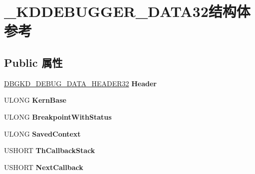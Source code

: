 \hypertarget{struct___k_d_d_e_b_u_g_g_e_r___d_a_t_a32}{}\section{\+\_\+\+K\+D\+D\+E\+B\+U\+G\+G\+E\+R\+\_\+\+D\+A\+T\+A32结构体 参考}
\label{struct___k_d_d_e_b_u_g_g_e_r___d_a_t_a32}
\subsection*{Public 属性}
\begin{DoxyCompactItemize}
\item 
\mbox{\label{struct___k_d_d_e_b_u_g_g_e_r___d_a_t_a32_abd3b5cc2f7dad7215608f9e3caf7b7af}} 
\hyperlink{struct___d_b_g_k_d___d_e_b_u_g___d_a_t_a___h_e_a_d_e_r32}{D\+B\+G\+K\+D\+\_\+\+D\+E\+B\+U\+G\+\_\+\+D\+A\+T\+A\+\_\+\+H\+E\+A\+D\+E\+R32} {\bfseries Header}
\item 
\mbox{\label{struct___k_d_d_e_b_u_g_g_e_r___d_a_t_a32_a4039d912a4bbc2f2decbd372b9776375}} 
U\+L\+O\+NG {\bfseries Kern\+Base}
\item 
\mbox{\label{struct___k_d_d_e_b_u_g_g_e_r___d_a_t_a32_a28595d229b393aea508272d3275a154f}} 
U\+L\+O\+NG {\bfseries Breakpoint\+With\+Status}
\item 
\mbox{\label{struct___k_d_d_e_b_u_g_g_e_r___d_a_t_a32_ab49cdfe4855922c1933a728ce05642c2}} 
U\+L\+O\+NG {\bfseries Saved\+Context}
\item 
\mbox{\label{struct___k_d_d_e_b_u_g_g_e_r___d_a_t_a32_a86be2fbc859b945672a31c5832cb9025}} 
U\+S\+H\+O\+RT {\bfseries Th\+Callback\+Stack}
\item 
\mbox{\label{struct___k_d_d_e_b_u_g_g_e_r___d_a_t_a32_af77ce320262b8e43abff0a7899dd478a}} 
U\+S\+H\+O\+RT {\bfseries Next\+Callback}
\item 
\mbox{\label{struct___k_d_d_e_b_u_g_g_e_r___d_a_t_a32_a7e182565619b8f808a88626568e78ebb}} 

\end{DoxyCompactItemize}
